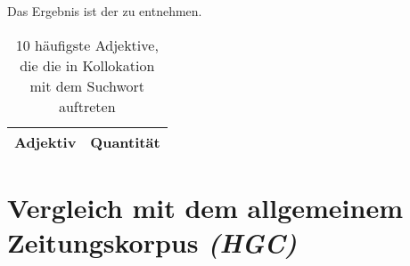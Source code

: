 \documentclass[%
	type=document,%
  	style=article,%
  	media=print,
  	pages=oneside,%
  	prefixLecturer=Dozenten:,
  	author=multiple,
]{unihildesheim} %
\begin{document}
Das Ergebnis ist der  zu entnehmen.
\begin{table}[htpb]\label{t}
	\center
	\begin{tabularx}{0.5\textwidth}{lr}
		\toprule
		\textbf{Adjektiv} & \textbf{Quantität}\\
		\midrule
		
		\bottomrule
	\end{tabularx}
	\caption{10 häufigste Adjektive, die die in Kollokation mit dem Suchwort
	auftreten}
	\label{tab:adj_mpraes}
\end{table}

\section{Vergleich mit dem allgemeinem Zeitungskorpus \textit{(HGC)}}
\end{document}
